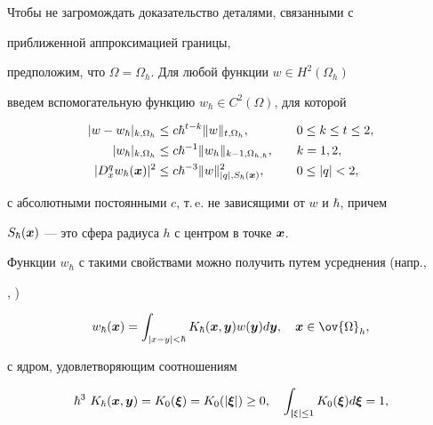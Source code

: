 \begin{pf} Чтобы не загромождать доказательство деталями, связанными с


приближенной аппроксимацией границы,


предположим, что $\Omega=\Omega_h$. Для любой функции $w\in H^2(\Omega_h)$


введем вспомогательную функцию $w_\hbar\in C^2(\Omega)$, для которой


\begin{alignat}{2}


|w-w_{\hbar}|_{{k,\Omega_h}}&\le c\hbar^{t-k}


\|w\|_{{t,\Omega_h}},&\quad & 0\le k\le t\le 2,\label{5.4}\\


|w_\hbar|_{{k,\Omega_h}}&\le


c\hbar^{-1}\|w_h\|_{{k-1,\Omega_{h,\hbar}}},&\quad &k=1,2,\label{5.5}\\


|D^q_x w_\hbar({\bi x})|^2&\le c\hbar^{-3}\|w\|^2_{{|q|,S_\hbar({\bi


x})}},&\quad &0\le|q|<2,\label{5.6}


\end{alignat}


с абсолютными постоянными $c$, т.\,e. не зависящими от $w$ и $\hbar$, причем


$S_\hbar({\boldsymbol x})$ --- это сфера радиуса $h$ с центром в точке ${\boldsymbol x}$.


Функции $w_\hbar$ с такими свойствами можно получить путем усреднения (напр.,


\cite{[10]}, \cite{[16]})


\begin{equation}\label{5.7}


w_\hbar({\bi x})=\int_{|x-y|<\hbar} K_\hbar({\bi x},{\bi y})w({\bi


y})d{\bi y},\quad {\bi x}\in\ov{\Omega}_h,


\end{equation}


с ядром, удовлетворяющим соотношениям


\begin{gather*}


\hbar^3\ K_\hbar({\bi x},{\bi y})=K_0({\bi {\xi}})=K_0(|{\bi {\xi}}|)\ge 0,


\quad \int_{{\bi {|\xi|}}\le 1}


K_0({\bi {\xi}})d{\bi {\xi}}=1,\\



\end{gather*}
\end{pf}
